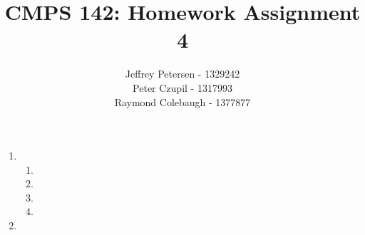 \documentclass{article}
\title{CMPS 142: Homework Assignment 4}
\author{Jeffrey Petersen - 1329242\\Peter Czupil - 1317993\\Raymond Colebaugh - 1377877}
\begin{document}
\maketitle
\begin{enumerate}
        \item 
            \begin{enumerate}
                \item
                \item
                \item
                \item
            \end{enumerate}
        \item 
\end{enumerate}
\end{document}
